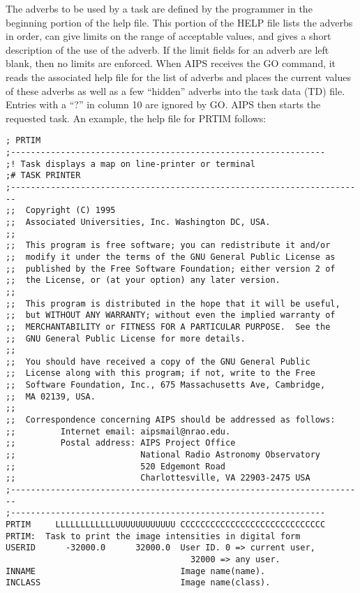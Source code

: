 The adverbs to be used by a task are defined by the programmer in the
beginning portion of the help file. This portion of the HELP file
lists the adverbs in order, can give limits on the range of acceptable
values, and gives a short description of the use of the adverb.  If
the limit fields for an adverb are left blank, then no limits are
enforced. When AIPS receives the GO command, it reads the associated
help file for the list of adverbs and places the current values of
these adverbs as well as a few ``hidden'' adverbs into the task data
(TD) file.  Entries with a ``?'' in column 10 are ignored by GO. AIPS then
starts the requested task.  An example, the help file for PRTIM
follows:

\begin{verbatim}
; PRTIM
;---------------------------------------------------------------
;! Task displays a map on line-printer or terminal
;# TASK PRINTER
;-----------------------------------------------------------------------
;;  Copyright (C) 1995
;;  Associated Universities, Inc. Washington DC, USA.
;;
;;  This program is free software; you can redistribute it and/or
;;  modify it under the terms of the GNU General Public License as
;;  published by the Free Software Foundation; either version 2 of
;;  the License, or (at your option) any later version.
;;
;;  This program is distributed in the hope that it will be useful,
;;  but WITHOUT ANY WARRANTY; without even the implied warranty of
;;  MERCHANTABILITY or FITNESS FOR A PARTICULAR PURPOSE.  See the
;;  GNU General Public License for more details.
;;
;;  You should have received a copy of the GNU General Public
;;  License along with this program; if not, write to the Free
;;  Software Foundation, Inc., 675 Massachusetts Ave, Cambridge,
;;  MA 02139, USA.
;;
;;  Correspondence concerning AIPS should be addressed as follows:
;;         Internet email: aipsmail@nrao.edu.
;;         Postal address: AIPS Project Office
;;                         National Radio Astronomy Observatory
;;                         520 Edgemont Road
;;                         Charlottesville, VA 22903-2475 USA
;-----------------------------------------------------------------------
;---------------------------------------------------------------
PRTIM     LLLLLLLLLLLLUUUUUUUUUUUU CCCCCCCCCCCCCCCCCCCCCCCCCCCCC
PRTIM:  Task to print the image intensities in digital form
USERID      -32000.0      32000.0  User ID. 0 => current user,
                                     32000 => any user.
INNAME                             Image name(name).
INCLASS                            Image name(class).

\end{verbatim}
